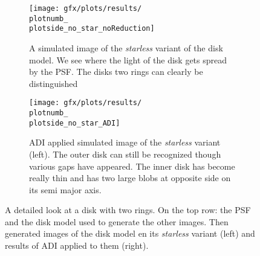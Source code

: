 \begin{figure}[!hbt]
{\begin{minipage}[t]{1.2\textwidth}
      \begin{subfigure}[t]{0.6\textwidth}
        \centering
        \texttt{[image: gfx/plots/results/\\plotnumb\_\\plotside\_no\_star\_noReduction]}
        \caption[]{A simulated image of the \textit{starless} variant of the disk model. We see where the light of the disk gets spread by the PSF. The disks two rings can clearly be distinguished}
      \end{subfigure}%
      \begin{subfigure}[t]{0.6\textwidth}
        \centering
        \texttt{[image: gfx/plots/results/\\plotnumb\_\\plotside\_no\_star\_ADI]}
        \caption[]{\ac{ADI} applied simulated image of the \textit{starless} variant (left). The outer disk can still be recognized though various gaps have appeared. The inner disk has become really thin and has two large blobs at opposite side on its semi major axis.}
      \end{subfigure}
  \end{minipage}
  }%

  \caption[]{A detailed look at a disk with two rings. On the top row: the \ac{PSF} and the disk model used to generate the other images. Then generated images of the disk model en its \textit{starless} variant (left) and results of \ac{ADI} applied to them (right).}
  \label{fig:\plotside:\plotnumb}
\end{figure}

